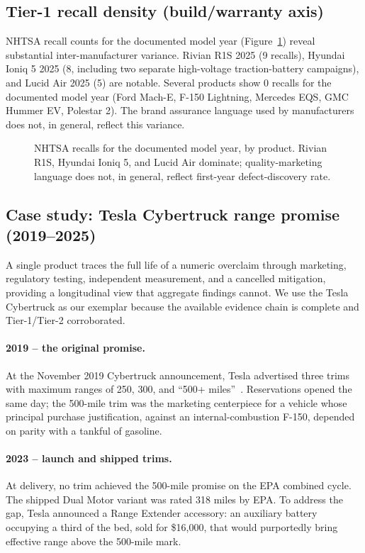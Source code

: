 \documentclass{article}
\begin{document}
\subsection{Tier-1 recall density (build/warranty axis)}

NHTSA recall counts for the documented model year (Figure~\ref{fig:recall-bars}) reveal substantial inter-manufacturer variance. Rivian R1S 2025 (9 recalls), Hyundai Ioniq 5 2025 (8, including two separate high-voltage traction-battery campaigns), and Lucid Air 2025 (5) are notable. Several products show 0 recalls for the documented model year (Ford Mach-E, F-150 Lightning, Mercedes EQS, GMC Hummer EV, Polestar 2). The brand assurance language used by manufacturers does not, in general, reflect this variance.

\begin{figure}[!htbp]
\centering

\caption{NHTSA recalls for the documented model year, by product. Rivian R1S, Hyundai Ioniq 5, and Lucid Air dominate; quality-marketing language does not, in general, reflect first-year defect-discovery rate.}
\label{fig:recall-bars}
\end{figure}
\FloatBarrier

\subsection{Case study: Tesla Cybertruck range promise (2019--2025)}\label{sec:case_cybertruck}

A single product traces the full life of a numeric overclaim through marketing, regulatory testing, independent measurement, and a cancelled mitigation, providing a longitudinal view that aggregate findings cannot. We use the Tesla Cybertruck as our exemplar because the available evidence chain is complete and Tier-1/Tier-2 corroborated.

\paragraph{2019 -- the original promise.} At the November 2019 Cybertruck announcement, Tesla advertised three trims with maximum ranges of 250, 300, and ``500+ miles''~\cite{insideevs_cybertruck_extender}. Reservations opened the same day; the 500-mile trim was the marketing centerpiece for a vehicle whose principal purchase justification, against an internal-combustion F-150, depended on parity with a tankful of gasoline.

\paragraph{2023 -- launch and shipped trims.} At delivery, no trim achieved the 500-mile promise on the EPA combined cycle. The shipped Dual Motor variant was rated 318 miles by EPA. To address the gap, Tesla announced a Range Extender accessory: an auxiliary battery occupying a third of the bed, sold for \$16{,}000, that would purportedly bring effective range above the 500-mile mark.
\end{document}
